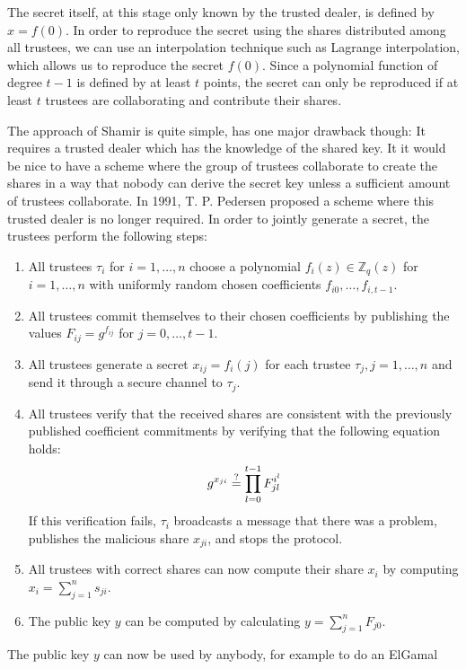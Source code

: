 \documentclass[numbers=noenddot, abstract=on, a4paper, headsepline,
footsepline, oneside, draft=off]{scrreprt}
\begin{document}
The secret itself, at this stage only known by the trusted dealer, is defined by
$x=f(0)$. In order to reproduce the secret using the shares distributed among
all trustees, we can use an interpolation technique such as Lagrange
interpolation, which allows us to reproduce the secret $f(0)$. Since a
polynomial function of degree $t-1$ is defined by at least $t$ points, the
secret can only be reproduced if at least $t$ trustees are collaborating and
contribute their shares.

The approach of Shamir is quite simple, has one major drawback though: It
requires a trusted dealer which has the knowledge of the shared key. It it
would be nice to have a scheme where the group of trustees collaborate to create
the shares in a way that nobody can derive the secret key unless a sufficient
amount of trustees collaborate. In 1991, T. P. Pedersen proposed a scheme
\cite{PED91} where this trusted dealer is no longer required. In order to
jointly generate a secret, the trustees perform the following steps:
\begin{enumerate}
  \item All trustees $\tau_i$ for $i = 1, \ldots, n$ choose a polynomial $f_i(z)
  \in \mathbb{Z}_q(z)$ for $i = 1, \ldots, n$ with uniformly random chosen coefficients $f_{i0}, \ldots,
  f_{i, t-1}$.
  \item All trustees commit themselves to their chosen coefficients by
  publishing the values $F_{ij} = g^{f_{ij}}$ for $j=0,\ldots, t-1$.
  \item All trustees generate a secret $x_{ij} = f_i(j)$ for each
  trustee $\tau_j, j=1,\ldots,n$ and send it through a secure channel to
  $\tau_j$.
  \item All trustees verify that the received shares are consistent with the
  previously published coefficient commitments by verifying that the following
  equation holds:
  \begin{equation}
	g^{x_{ji}} \stackrel{?}{=} \prod_{l=0}^{t-1} F_{jl}^{i^l} \notag
  \end{equation}
  If this verification fails, $\tau_i$ broadcasts a message that there was a
  problem, publishes the malicious share $x_{ji}$, and stops the protocol.
  \item All trustees with correct shares can now compute their share $x_i$ by
  computing $x_i=\sum_{j=1}^n s_{ji}$.
  \item The public key $y$ can be computed by calculating $y=\sum_{j=1}^n
  F_{j0}$.
\end{enumerate}
The public key $y$ can now be used by anybody, for example to do an ElGamal
\end{document}
